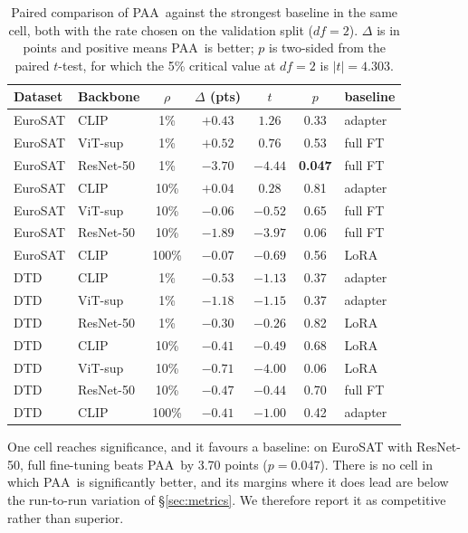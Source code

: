 \documentclass[preprint,12pt]{elsarticle}
\newcommand{\ours}{\textsc{PAA}}
\begin{document}
\begin{table}[t]
\centering
\caption{Paired comparison of \ours\ against the strongest baseline in the same
cell, both with the rate chosen on the validation split ($df=2$). $\Delta$ is in
points and positive means \ours\ is better; $p$ is two-sided from the paired
$t$-test, for which the 5\% critical value at $df=2$ is $|t|=4.303$.}
\label{tab:stats}
\small
\setlength{\tabcolsep}{4pt}
\begin{tabular}{llcccc l}
\toprule
Dataset & Backbone & $\rho$ & $\Delta$ (pts) & $t$ & $p$ & baseline \\
\midrule
EuroSAT & CLIP    & 1\%   & $+0.43$ & $1.26$  & 0.33 & adapter \\
EuroSAT & ViT-sup & 1\%   & $+0.52$ & $0.76$  & 0.53 & full FT \\
EuroSAT & ResNet-50 & 1\% & $-3.70$ & $-4.44$ & \textbf{0.047} & full FT \\
EuroSAT & CLIP    & 10\%  & $+0.04$ & $0.28$  & 0.81 & adapter \\
EuroSAT & ViT-sup & 10\%  & $-0.06$ & $-0.52$ & 0.65 & full FT \\
EuroSAT & ResNet-50 & 10\% & $-1.89$ & $-3.97$ & 0.06 & full FT \\
EuroSAT & CLIP    & 100\% & $-0.07$ & $-0.69$ & 0.56 & LoRA \\
DTD     & CLIP    & 1\%   & $-0.53$ & $-1.13$ & 0.37 & adapter \\
DTD     & ViT-sup & 1\%   & $-1.18$ & $-1.15$ & 0.37 & adapter \\
DTD     & ResNet-50 & 1\% & $-0.30$ & $-0.26$ & 0.82 & LoRA \\
DTD     & CLIP    & 10\%  & $-0.41$ & $-0.49$ & 0.68 & LoRA \\
DTD     & ViT-sup & 10\%  & $-0.71$ & $-4.00$ & 0.06 & LoRA \\
DTD     & ResNet-50 & 10\% & $-0.47$ & $-0.44$ & 0.70 & full FT \\
DTD     & CLIP    & 100\% & $-0.41$ & $-1.00$ & 0.42 & adapter \\
\bottomrule
\end{tabular}
\end{table}

One cell reaches significance, and it favours a baseline: on EuroSAT with
ResNet-50, full fine-tuning beats \ours\ by 3.70 points ($p=0.047$). There is no
cell in which \ours\ is significantly better, and its margins where it does lead
are below the run-to-run variation of \S\ref{sec:metrics}. We therefore report it
as competitive rather than superior.
\end{document}
